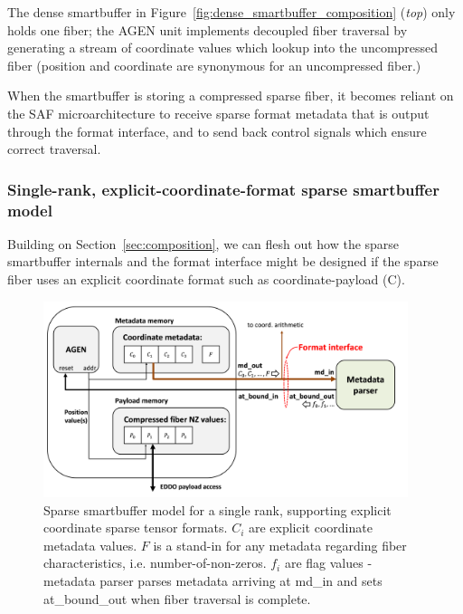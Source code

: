 The dense smartbuffer in Figure~\ref{fig:dense_smartbuffer_composition} (\textit{top}) only holds one fiber; the AGEN unit implements decoupled fiber traversal by generating a stream of coordinate values which lookup into the uncompressed fiber (position and coordinate are synonymous for an uncompressed fiber.)

When the smartbuffer is storing a compressed sparse fiber, it becomes reliant on the SAF microarchitecture to receive sparse format metadata that is output through the format interface, and to send back control signals which ensure correct traversal.

\subsubsection{Single-rank, explicit-coordinate-format sparse smartbuffer model}
\label{sec:single_explicit_fiber}

Building on Section~\ref{sec:composition}, we can flesh out how the sparse smartbuffer internals and the format interface might be designed if the sparse fiber uses an explicit coordinate\cite{szebook} format such as coordinate-payload (C)\cite{szebook}.

\begin{figure}[ht]
    \centering
    \includegraphics[width=0.95\textwidth]{figures/single_rank_explicit_coordinate_smartbuffer_model.png}
    \caption{Sparse smartbuffer model for a single rank, supporting explicit coordinate sparse tensor formats. ${C_i}$ are explicit coordinate metadata values. $F$ is a stand-in for any metadata regarding fiber characteristics, i.e. number-of-non-zeros. ${f_i}$ are flag values - metadata parser parses metadata arriving at md\_in and sets at\_bound\_out when fiber traversal is complete.}
    \label{fig:single_rank_explicit_coordinate_smartbuffer_model}
\end{figure}

